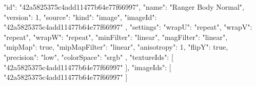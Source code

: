 {
  "id": "42a5825375c4add11477b64e77f66997",
  "name": "Ranger Body Normal",
  "version": 1,
  "source": {
    "kind": "image",
    "imageId": "42a5825375c4add11477b64e77f66997"
  },
  "settings": {
    "wrapU": "repeat",
    "wrapV": "repeat",
    "wrapW": "repeat",
    "minFilter": "linear",
    "magFilter": "linear",
    "mipMap": true,
    "mipMapFilter": "linear",
    "anisotropy": 1,
    "flipY": true,
    "precision": "low",
    "colorSpace": "srgb"
  },
  "textureIds": [
    "42a5825375c4add11477b64e77f66997"
  ],
  "imageIds": [
    "42a5825375c4add11477b64e77f66997"
  ]
}
